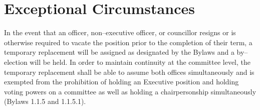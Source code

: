\section{Exceptional Circumstances}
In the event that an officer, non--executive officer, or councillor resigns or is otherwise required to vacate the position prior to the completion of their term, a temporary replacement will be assigned as designated by the Bylaws and a by--election will be held. In order to maintain continuity at the committee level, the temporary replacement shall be able to assume both offices simultaneously and is exempted from the prohibition of holding an Executive position and holding voting powers on a committee as well as holding a chairpersonship simultaneously (Bylaws 1.1.5 and 1.1.5.1).

